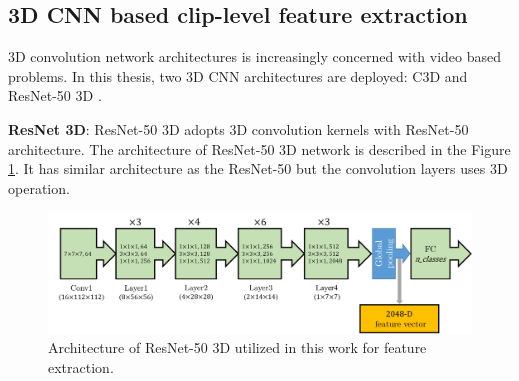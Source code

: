 
\subsection{3D CNN based clip-level feature extraction}
    3D convolution network architectures is increasingly concerned with video based problems. 
    In this thesis, two 3D CNN architectures are deployed: C3D \cite{duta2017spatio} and ResNet-50 3D \cite{hara2018can}. 

    \textbf{ResNet 3D}: ResNet-50 3D adopts 3D convolution kernels with ResNet-50 architecture. %
    The architecture of ResNet-50 3D network is described in the Figure \ref{fig:resnet50_3d}. It has similar architecture as the ResNet-50 but the convolution layers uses 3D operation.  
    \begin{figure}[htbp]
        \centering
        \includegraphics[width=1\linewidth]{figs/Resnet50_3D.png}
        \caption{Architecture of ResNet-50 3D utilized in this work for feature extraction.}
        \label{fig:resnet50_3d}
    \end{figure}

